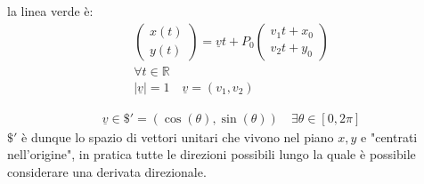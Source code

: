 \documentclass[a4paper, oneside]{article}
\begin{document}
        la linea verde è:
        \begin{gather*}
            \begin{pmatrix}
                x(t)\\
                y(t)
            \end{pmatrix} = \underline{v} t + P_0 \begin{pmatrix}
                v_1t+x_0\\
                v_2t +y_0
            \end{pmatrix}\\
            \forall t \in \mathbb{R}\\
             |\underline{v}|   = 1 \quad \underline{v} = (v_1,v_2)
        \end{gather*}
        
        \begin{gather*}
            \underline{v} \in \mathdollar ' = (\cos(\theta) , \sin(\theta)) \quad \exists \theta \in [0, 2\pi]
        \end{gather*}
        $\$'$ è dunque lo spazio di vettori unitari che vivono nel piano $x,y$ e "centrati nell'origine", in pratica tutte le direzioni possibili lungo la quale è possibile considerare una derivata direzionale.
\end{document}
